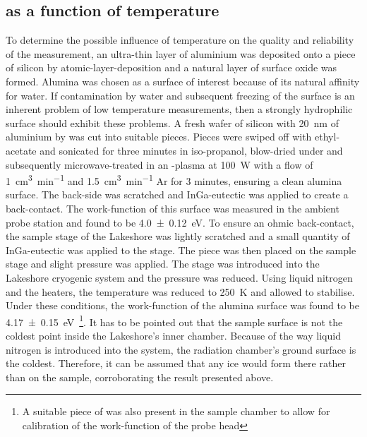 \subsection{\cpd{} as a function of temperature}
To determine the possible influence of temperature on the quality and reliability of the measurement, an ultra-thin layer of aluminium was deposited onto a piece of silicon by atomic-layer-deposition and a natural layer of surface oxide was formed. Alumina was chosen as a surface of interest because of its natural affinity for water. If contamination by water and subsequent freezing of the surface is an inherent problem of low temperature \cpd{} measurements, then a strongly hydrophilic surface should exhibit these problems. A fresh wafer of silicon with \SI{20}{\nano\metre} of aluminium by \ald{} was cut into suitable pieces. Pieces were swiped off with ethyl-acetate and sonicated for three minutes in iso-propanol, blow-dried under \nitro{} and subsequently microwave-treated in an \oxy{}-plasma at \SI{100}{\watt} with a flow of \SI{1}{\cubic\centi\metre\per\minute} \oxy{} and \SI{1.5}{\cubic\centi\metre\per\minute} Ar for 3 minutes, ensuring a clean alumina surface. The back-side was scratched and InGa-eutectic was applied to create a back-contact. The work-function of this surface was measured in the ambient probe station and found to be \SI{4.0+-0.12}{\electronvolt}. To ensure an ohmic back-contact, the sample stage of the Lakeshore was lightly scratched and a small quantity of InGa-eutectic was applied to the stage. The piece was then placed on the sample stage and slight pressure was applied. The stage was introduced into the Lakeshore cryogenic system and the pressure was reduced. Using liquid nitrogen and the heaters, the temperature was reduced to \SI{250}{\kelvin} and allowed to stabilise. Under these conditions, the work-function of the alumina surface was found to be \SI{4.17+-0.15}{\electronvolt}~\footnote{A suitable piece of \hopg{} was also present in the sample chamber to allow for calibration of the work-function of the probe head}. It has to be pointed out that the sample surface is not the coldest point inside the Lakeshore's inner chamber. Because of the way liquid nitrogen is introduced into the system, the radiation chamber's ground surface is the coldest. Therefore, it can be assumed that any ice would form there rather than on the sample, corroborating the result presented above.
